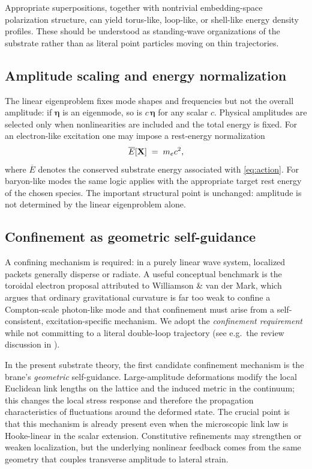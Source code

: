 Appropriate superpositions, together with nontrivial embedding-space polarization structure, can yield torus-like,
loop-like, or shell-like energy density profiles.
These should be understood as standing-wave organizations of the substrate rather than as literal point particles
moving on thin trajectories.

\subsection{Amplitude scaling and energy normalization}

The linear eigenproblem fixes mode shapes and frequencies but not the overall amplitude:
if $\bm{\eta}$ is an eigenmode, so is $c\,\bm{\eta}$ for any scalar $c$.
Physical amplitudes are selected only when nonlinearities are included and the total energy is fixed.
For an electron-like excitation one may impose a rest-energy normalization
\begin{equation}
  \overline{E}[\mathbf{X}] \;=\; m_e c^2,
  \label{eq:rest-energy-normalization}
\end{equation}
where $\overline{E}$ denotes the conserved substrate energy associated with \eqref{eq:action}.
For baryon-like modes the same logic applies with the appropriate target rest energy of the chosen species.
The important structural point is unchanged: amplitude is not determined by the linear eigenproblem alone.

\subsection{Confinement as geometric self-guidance}

A confining mechanism is required: in a purely linear wave system, localized packets generally disperse or radiate.
A useful conceptual benchmark is the toroidal electron proposal attributed to Williamson \& van der Mark, which argues
that ordinary gravitational curvature is far too weak to confine a Compton-scale photon-like mode and that confinement
must arise from a self-consistent, excitation-specific mechanism.
We adopt the \emph{confinement requirement} while not committing to a literal double-loop trajectory
(see e.g.\ the review discussion in \citep{HuygensOptics2025}).

In the present substrate theory, the first candidate confinement mechanism is the brane's \emph{geometric}
self-guidance.
Large-amplitude deformations modify the local Euclidean link lengths on the lattice and the induced metric in the
continuum; this changes the local stress response and therefore the propagation characteristics of fluctuations around
the deformed state.
The crucial point is that this mechanism is already present even when the microscopic link law is Hooke-linear in the
scalar extension.
Constitutive refinements may strengthen or weaken localization, but the underlying nonlinear feedback comes from the
same geometry that couples transverse amplitude to lateral strain.

